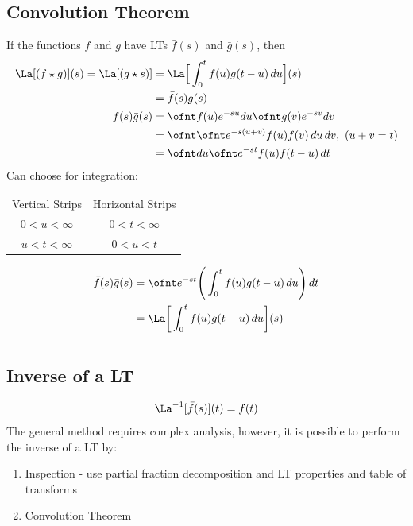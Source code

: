 \documentclass[a4paper, 11pt, normalem]{report}
\begin{document}
\section{Convolution Theorem}
If the functions $f$ and $g$ have LTs $\bar{f}(s)$ and $\bar{g}(s)$, then
\begin{align*}
    \La[(f \star g)](s) = \La[(g \star s)] &= \La\Big[\int_{0}^{t} f(u)g(t - u)\,du \Big](s) \\
    &= \bar{f}(s)\bar{g}(s) \\
    \bar{f}(s)\bar{g}(s) &= \ofnt f(u)e^{-su}du \ofnt g(v)e^{-sv}dv \\
    &= \ofnt \ofnt e^{-s(u + v)}f(u)f(v)\, du\,dv,~ (u + v = t) \\
    &= \ofnt du \ofnt e^{-st}f(u)f(t - u)\,dt
\end{align*}
Can choose for integration:
\begin{tabular}{c|c}
    Vertical Strips & Horizontal Strips \\
    $0 < u < \infty$ & $0 < t < \infty$ \\
    $u < t < \infty$ & $0 < u < t$
\end{tabular}
\begin{align*}
    \bar{f}(s)\bar{g}(s) &= \ofnt e^{-st} \Bigg(\int_{0}^{t} f(u)g(t - u)\, du\Bigg)\,dt \\
    &= \La\bigg[\int_{0}^{t} f(u)g(t - u)\,du\bigg](s)
\end{align*}

\chapter{}
\section{Inverse of a LT}
\begin{equation*}
    \La^{-1}[\bar{f}(s)](t) = f(t)
\end{equation*}
The general method requires complex analysis, however, it is possible to perform the inverse of a LT by:
\begin{enumerate}
    \item Inspection - use partial fraction decomposition and LT properties and table of transforms
    \item Convolution Theorem
\end{enumerate}
\end{document}
